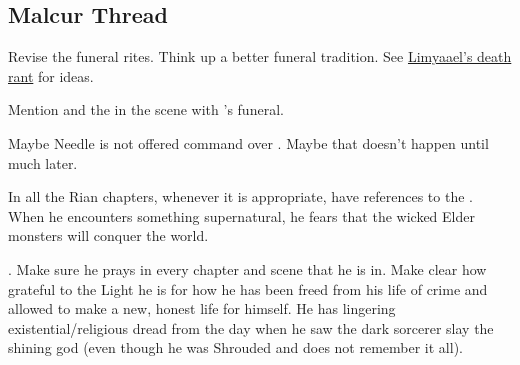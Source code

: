 \subsection{Malcur Thread}
\begin{changes}
  \begin{comment}\paragraph{Beyond the Veil}\end{comment}
    Revise the funeral rites. 
    Think up a better funeral tradition. 
    See \href{http://limyaael.livejournal.com/179073.html}{Limyaael's death rant} for ideas. 

  \begin{comment}\paragraph{Veils that Divide}\end{comment}
    Mention \Isphet and the \qliphoth in the scene with \Icor's funeral. 


  
  \begin{comment}\paragraph{A Dark Angel's Gift}\end{comment}
    Maybe Needle is not offered command over \banes. 
    Maybe that doesn't happen until much later. 
  
  \begin{comment}\paragraph{Captured}\end{comment}
    
    In all the Rian chapters, whenever it is appropriate, have references to the . 
    When he encounters something supernatural, he fears that the wicked Elder monsters will conquer the world. 
    
    .
    Make sure he prays in every chapter and scene that he is in.
    Make clear how grateful to the Light he is for how he has been freed from his life of crime and allowed to make a new, honest life for himself.
    He has lingering existential/religious dread from the day when he saw the dark sorcerer slay the shining god (even though he was Shrouded and does not remember it all). 
  

\end{changes}

